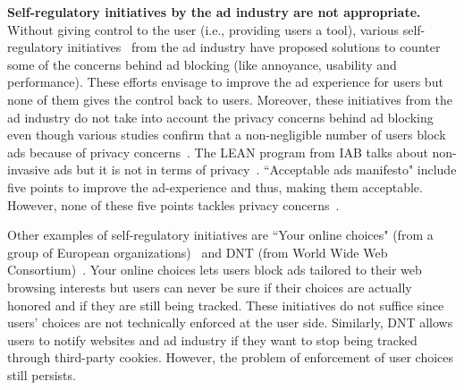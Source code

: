 \documentclass[conference]{IEEEtran}
\begin{document}
\textbf{Self-regulatory initiatives by the ad industry are not appropriate.}
Without giving control to the user (i.e., providing users a tool), various self-regulatory initiatives~\cite{lean, acceptableads} from the ad industry have proposed solutions to counter some of the concerns behind ad blocking (like annoyance, usability and performance).
These efforts envisage to improve the ad experience for users but none of them gives the control back to users.
Moreover, these initiatives from the ad industry do not take into account the privacy concerns behind ad blocking even though various studies confirm 
that a non-negligible number of users block ads because of privacy concerns~\cite{pagefaire_report_2015,profiling_adblockers,dcn_adblock_report}.
The LEAN program from IAB talks about non-invasive ads but it is not in terms of privacy~\cite{lean}.
``Acceptable ads manifesto" include five points to improve the ad-experience and thus, making them acceptable.
However, none of these five points tackles privacy concerns~\cite{acceptableads}.

Other examples of self-regulatory initiatives are ``Your online choices" (from a group of European organizations)~\cite{YourOnlineChoicesWeb} and DNT (from World Wide Web Consortium)~\cite{DNT15W3C}.
Your online choices lets users block ads tailored to their web browsing interests but users can never be sure if their choices are actually honored and if they are still being tracked.
These initiatives do not suffice since users' choices are not technically enforced at the user side.
Similarly, DNT allows users to notify websites and ad industry if they want to stop being tracked through third-party cookies.
However, the problem of enforcement of user choices still persists.
\end{document}
